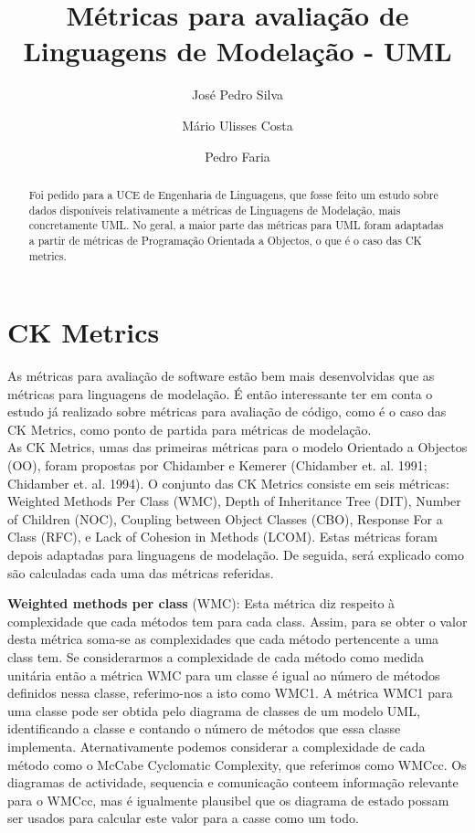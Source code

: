 \documentclass[10pt]{article}
\title{\sf  Métricas para avaliação de Linguagens de Modelação - UML}
\author{ José Pedro Silva \and Mário Ulisses Costa \and Pedro Faria }
\date{}
\begin{document}
\maketitle

\begin{abstract}
Foi pedido para a UCE de Engenharia de Linguagens, que fosse feito um estudo sobre dados disponíveis relativamente a 
métricas de Linguagens de Modelação, mais concretamente UML. No geral, a maior parte das métricas para UML foram adaptadas a partir
de métricas de Programação Orientada a Objectos, o que é o caso das CK metrics.
\end{abstract}


\section{CK Metrics}
As métricas para avaliação de  software estão bem mais desenvolvidas que as métricas para linguagens de modelação. É então interessante ter em conta o estudo já realizado sobre métricas para avaliação de código, como é o caso das CK Metrics, como ponto de partida para métricas de modelação.\\
As CK Metrics, umas das primeiras métricas para o modelo Orientado a Objectos (OO), foram propostas por Chidamber e  Kemerer (Chidamber et. al. 1991; Chidamber et. al. 1994). O conjunto das CK Metrics consiste em seis métricas: Weighted Methods Per Class (WMC), Depth of Inheritance Tree (DIT), Number of Children (NOC), Coupling between Object Classes (CBO), Response For a Class (RFC), e Lack of Cohesion in Methods (LCOM). Estas métricas foram depois adaptadas para linguagens de modelação. De seguida, será explicado como são calculadas cada uma das métricas referidas.


\textbf{Weighted methods per class} (WMC):
Esta métrica diz respeito à complexidade que cada métodos tem para cada class. Assim, para se obter o valor desta métrica soma-se
as complexidades que cada método pertencente a uma class tem. Se considerarmos a complexidade de cada método como medida unitária
então a métrica WMC para um classe é igual ao número de métodos definidos nessa classe, referimo-nos a isto como WMC1.
A métrica WMC1 para uma classe pode ser obtida pelo diagrama de classes de um modelo UML, identificando a classe e contando o número
de métodos que essa classe implementa. Aternativamente podemos considerar a complexidade de cada método como o McCabe Cyclomatic Complexity, que referimos
como WMCcc. Os diagramas de actividade, sequencia e comunicação conteem informação relevante para o WMCcc, mas é igualmente
plausibel que os diagrama de estado possam ser usados para calcular este valor para a casse como um todo.\\
\end{document}
